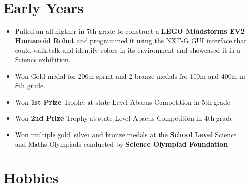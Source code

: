 \documentclass[11pt,a4paper,sans]{moderncv} %
\begin{document}

\section{Early Years}
\begin{itemize}
    \item Pulled an all nigther in 7th grade to construct a \textbf{LEGO Mindstorms EV2 
    Humanoid Robot} and programmed it using the NXT-G GUI interface that could walk,talk 
    and identify colors in its environment and showcased it in a Science exhibition.
    \item Won Gold medal for 200m sprint and 2 bronze medals fro 100m and 400m in 8th grade.
    \item Won \textbf{1st Prize} Trophy at state Level Abacus Competition in 5th grade
    \item Won \textbf{2nd Prize} Trophy at state Level Abacus Competition in 4th grade     
    \item Won multiple gold, silver and bronze medals at the \textbf{School Level}  Science 
    and Maths Olympiads conducted by \textbf{Science Olympiad Foundation}            
\end{itemize}



\section{Hobbies}

\renewcommand{\listitemsymbol}{-~} %


\end{document}
